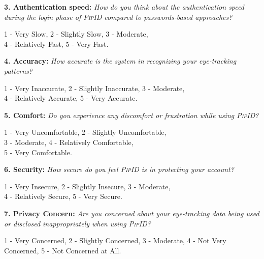 \documentclass[sigconf]{acmart}
\newcommand{\sysname}{\textsc{PipID}\xspace}
\begin{document}
\begin{tcolorbox}[notitle, boxrule=0pt,left=0.2cm, right=0.2cm, top=0.1cm, bottom=0.1cm]
\textbf{3. Authentication speed:} \textit{How do you think about the authentication speed during the login phase of \sysname compared to passwords-based approaches?}

1 - Very Slow, 2 - Slightly Slow, 3 - Moderate,\\4 - Relatively Fast, 5 - Very Fast.
\end{tcolorbox} 

\begin{tcolorbox}[notitle, boxrule=0pt,left=0.2cm, right=0.2cm, top=0.1cm, bottom=0.1cm]
\textbf{4. Accuracy:} \textit{How accurate is the system in recognizing your eye-tracking patterns? }

1 - Very Inaccurate, 2 - Slightly Inaccurate, 3 - Moderate, \\4 - Relatively Accurate, 5 - Very Accurate.
\end{tcolorbox} 

\begin{tcolorbox}[notitle, boxrule=0pt,left=0.2cm, right=0.2cm, top=0.1cm, bottom=0.1cm]
\textbf{5. Comfort:} \textit{Do you experience any discomfort or frustration while using \sysname?} 

1 - Very Uncomfortable, 2 - Slightly Uncomfortable, \\3 - Moderate, 4 - Relatively Comfortable, \\5 - Very Comfortable.
\end{tcolorbox} 

\begin{tcolorbox}[notitle, boxrule=0pt,left=0.2cm, right=0.2cm, top=0.1cm, bottom=0.1cm]
\textbf{6. Security:} \textit{How secure do you feel \sysname is in protecting your account? }

1 - Very Insecure, 2 - Slightly Insecure, 3 - Moderate, \\4 - Relatively Secure, 5 - Very Secure.
\end{tcolorbox} 

\begin{tcolorbox}[notitle, boxrule=0pt,left=0.2cm, right=0.2cm, top=0.1cm, bottom=0.1cm]
\textbf{7. Privacy Concern:} \textit{Are you concerned about your eye-tracking data being used or disclosed inappropriately when using \sysname? }

1 - Very Concerned, 2 - Slightly Concerned, 3 - Moderate, 4 - Not Very Concerned, 5 - Not Concerned at All.
\end{tcolorbox} 
\end{document}
